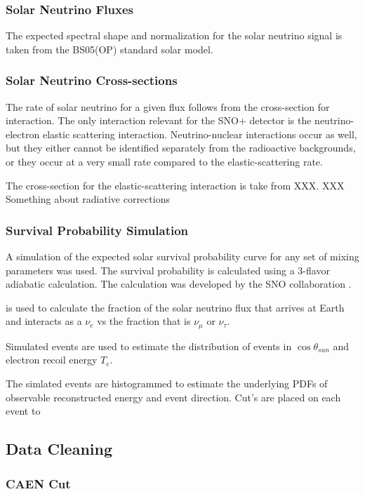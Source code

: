 \subsubsection{Solar Neutrino Fluxes}
The expected spectral shape and normalization for the solar neutrino signal is
taken from the BS05(OP) standard solar model.

\subsubsection{Solar Neutrino Cross-sections}
The rate of solar neutrino for a given flux follows from the cross-section for
interaction. The only interaction relevant for the SNO+ detector is the
neutrino-electron elastic scattering interaction.
Neutrino-nuclear interactions occur as well, but they either cannot be identified
separately from the radioactive backgrounds, or they occur at a very small rate
compared to the elastic-scattering rate.

The cross-section for the elastic-scattering interaction is take from
XXX.
XXX Something about radiative corrections

\subsubsection{Survival Probability Simulation}
A simulation of the expected solar survival probability curve for any set of mixing
parameters was used. The survival probability is calculated using a
3-flavor adiabatic calculation. The calculation was developed by the 
SNO collaboration \cite{XXX}.


is used to calculate the fraction of the solar neutrino flux that arrives
at Earth and interacts as a $\nu_{e}$ vs the fraction that is $\nu_{\mu}$ or $\nu_{\tau}$.




Simulated events are used to estimate the distribution of events in $\cos\theta_{sun}$ and
electron recoil energy $T_{e}$.

The simlated events are histogrammed to estimate the underlying PDFs
of observable reconstructed energy and event direction. Cut's are placed
on each event to

\subsection{Data Cleaning}
\subsubsection{CAEN Cut}

